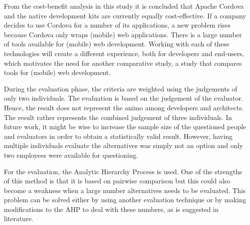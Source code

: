 From the cost-benefit analysis in this study it is concluded that Apache Cordova and the native development kits are currently equally cost-effective. If a company decides to use Cordova for a number of its applications, a new problem rises because Cordova only wraps (mobile) web applications. There is a large number of tools available for (mobile) web development. Working with each of these technologies will create a different experience, both for developers and end-users, which motivates the need for another comparative study, a study that compares tools for (mobile) web development. 

During the evaluation phase, the criteria are weighted using the judgements of only two individuals. The evaluation is based on the judgement of the evaluator. Hence, the result does not represent the animo among developers and architects. The result rather represents the combined judgement of three individuals. In future work, it might be wise to increase the sample size of the questioned people and evaluators in order to obtain a statistically valid result. However, having multiple individuals evaluate the alternatives was simply not an option and only two employees were available for questioning. 

For the evaluation, the Analytic Hierarchy Process is used. One of the strengths of this method is that it is based on pairwise comparison but this could also become a weakness when a large number alternatives needs to be evaluated. This problem can be solved either by using another evaluation technique or by making modifications to the AHP to deal with these numbers, as is suggested in literature.




